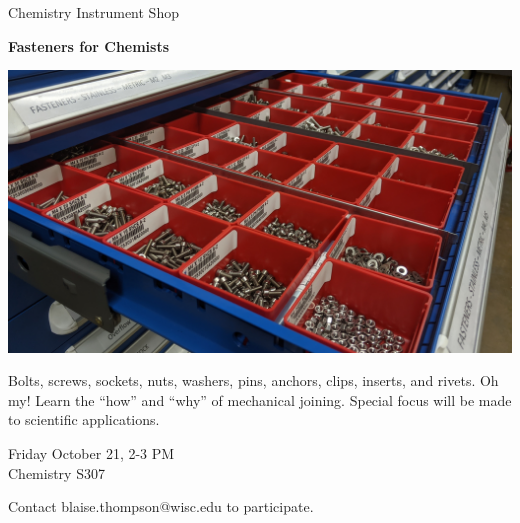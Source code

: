 \documentclass{article}
\begin{document}
\center

\Huge

Chemistry Instrument Shop

\textbf{
Fasteners for Chemists
}

\includegraphics[width=\linewidth]{coverart.jpg}

{
\huge
Bolts, screws, sockets, nuts, washers, pins, anchors, clips, inserts, and rivets.
Oh my!
Learn the ``how'' and ``why'' of mechanical joining.
Special focus will be made to scientific applications.
}

\vfill

{
\huge
Friday October 21, 2-3 PM \\
Chemistry S307
}

\vfill

{
\huge
Contact blaise.thompson@wisc.edu to participate.
}
\end{document}
